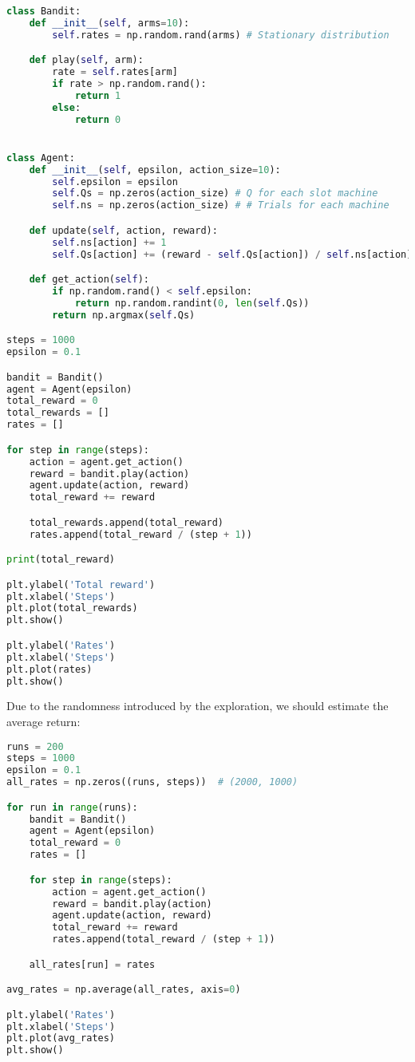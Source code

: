 \begin{lstlisting}[language=Python]
class Bandit:
    def __init__(self, arms=10):
        self.rates = np.random.rand(arms) # Stationary distribution

    def play(self, arm):
        rate = self.rates[arm]
        if rate > np.random.rand():
            return 1
        else:
            return 0


class Agent:
    def __init__(self, epsilon, action_size=10):
        self.epsilon = epsilon
        self.Qs = np.zeros(action_size) # Q for each slot machine
        self.ns = np.zeros(action_size) # # Trials for each machine

    def update(self, action, reward):
        self.ns[action] += 1
        self.Qs[action] += (reward - self.Qs[action]) / self.ns[action] # Incremental approach

    def get_action(self):
        if np.random.rand() < self.epsilon:
            return np.random.randint(0, len(self.Qs))
        return np.argmax(self.Qs)

steps = 1000
epsilon = 0.1

bandit = Bandit()
agent = Agent(epsilon)
total_reward = 0
total_rewards = []
rates = []

for step in range(steps):
    action = agent.get_action()
    reward = bandit.play(action)
    agent.update(action, reward)
    total_reward += reward

    total_rewards.append(total_reward)
    rates.append(total_reward / (step + 1))

print(total_reward)

plt.ylabel('Total reward')
plt.xlabel('Steps')
plt.plot(total_rewards)
plt.show()

plt.ylabel('Rates')
plt.xlabel('Steps')
plt.plot(rates)
plt.show()
\end{lstlisting}

Due to the randomness introduced by the exploration, we should estimate the average return:
\begin{lstlisting}[language=Python]
runs = 200
steps = 1000
epsilon = 0.1
all_rates = np.zeros((runs, steps))  # (2000, 1000)

for run in range(runs):
    bandit = Bandit()
    agent = Agent(epsilon)
    total_reward = 0
    rates = []

    for step in range(steps):
        action = agent.get_action()
        reward = bandit.play(action)
        agent.update(action, reward)
        total_reward += reward
        rates.append(total_reward / (step + 1))

    all_rates[run] = rates

avg_rates = np.average(all_rates, axis=0)

plt.ylabel('Rates')
plt.xlabel('Steps')
plt.plot(avg_rates)
plt.show()
\end{lstlisting}








